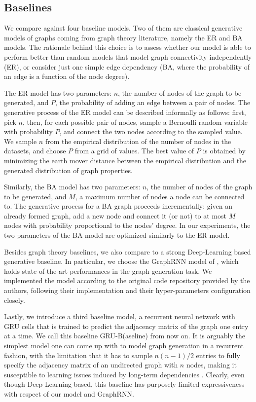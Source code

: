 

\subsection{Baselines}
We compare against four baseline models. Two of them are classical generative models of graphs coming from graph theory literature, namely the ER and BA models. The rationale behind this choice is to assess whether our model is able to perform better than random models that model graph connectivity independently (ER), or consider just one simple edge dependency (BA, where the probability of an edge is a function of the node degree).

The ER model has two parameters: $n$, the number of nodes of the graph to be generated, and $P$, the probability of adding an edge between a pair of nodes. The generative process of the ER model can be described informally as follows: first, pick $n$, then, for each possible pair of nodes, sample a Bernoulli random variable with probability $P$, and connect the two nodes according to the sampled value. We sample $n$ from the empirical distribution of the number of nodes in the datasets, and choose $P$ from a grid of values. The best value of $P$ is obtained by minimizing the earth mover distance between the empirical distribution and the generated distribution of graph properties.

Similarly, the BA model has two parameters: $n$, the number of nodes of the graph to be generated, and $M$, a maximum number of nodes a node can be connected to. The generative process for a BA graph proceeds incrementally: given an already formed graph, add a new node and connect it (or not) to at most $M$ nodes with probability proportional to the nodes' degree. In our experiments, the two parameters of the BA model are optimized similarly to the ER model.

Besides graph theory baselines, we also compare to a strong Deep-Learning based generative baseline. In particular, we choose the GraphRNN model of \citet{you2018graphrnn}, which holds state-of-the-art performances in the graph generation task. We implemented the model according to the original code repository provided by the authors, following their implementation and their hyper-parameters configuration closely.

Lastly, we introduce a third baseline model, a recurrent neural network with GRU cells that is trained to predict the adjacency matrix of the graph one entry at a time. We call this baseline GRU-B(aseline) from now on. It is arguably the simplest model one can come up with to model graph generation in a recurrent fashion, with the limitation that it has to sample $n(n-1)/2$ entries to fully specify the adjacency matrix of an undirected graph with $n$ nodes, making it susceptible to learning issues induced by long-term dependencies \citep{bengio1994learninglongtermdependenciesdifficult}. Clearly, even though Deep-Learning based, this baseline has purposely limited expressiveness with respect of our model and GraphRNN.

